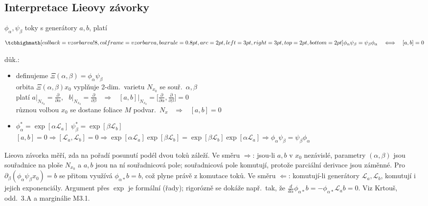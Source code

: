 \subsection{Interpretace Lieovy závorky}

\begin{veta}[Tvrzení]
$\phi_\alpha,\psi_\beta$ toky s generátory $a,b$, platí
\[
  \vzorec{\phi_\alpha\psi_\beta = \psi_\beta\phi_\alpha \quad\Longleftrightarrow\quad [a,b] = 0}
\]
\end{veta}
důk.:
\begin{itemize}[nosep]
  \item[$\Rightarrow$] definujeme $\Xi(\alpha,\beta) = \phi_\alpha\psi_\beta$ \\
    orbita $\Xi(\alpha,\beta)x_0$ vyplňuje 2-dim.\ varietu $N_{x_0}$ se souř.\ $\alpha,\beta$ \\
    platí $a\big|_{N_{x_0}} = \frac{\partial}{\partial\alpha}$, \ $b\big|_{N_{x_0}} = \frac{\partial}{\partial\beta}$
    \ $\Rightarrow$ \ $[a,b]\big|_{N_{x_0}} = \big[\frac{\partial}{\partial\alpha},\frac{\partial}{\partial\beta}\big] = 0$ \\
    různou volbou $x_0$ se dostane foliace $M$ podvar.\ $N_x$ \ $\Rightarrow$ \ $[a,b] = 0$
  \item[$\Leftarrow$] $\phi_\alpha^* = \exp[\alpha\mathcal{L}_a]$ \quad $\psi_\beta^* = \exp[\beta\mathcal{L}_b]$ \\
    $[a,b] = 0 \Rightarrow [\mathcal{L}_a,\mathcal{L}_b] = 0 \Rightarrow
    \exp[\alpha\mathcal{L}_a]\exp[\beta\mathcal{L}_b] = \exp[\beta\mathcal{L}_b]\exp[\alpha\mathcal{L}_a]
    \Rightarrow \phi_\alpha\psi_\beta = \psi_\beta\phi_\alpha$
\end{itemize}

\begin{vysvetleni}
Lieova závorka měří, zda na pořadí posunutí podél dvou toků záleží. Ve směru $\Rightarrow$: jsou-li $a,b$ v $x_0$ nezávislé, parametry $(\alpha,\beta)$ jsou souřadnice na ploše $N_{x_0}$ a $a,b$ jsou na ní souřadnicová pole; souřadnicová pole komutují, protože parciální derivace jsou záměnné. Pro $\partial_\beta(\phi_\alpha\psi_\beta x_0)=b$ se přitom využívá $\phi_{\alpha*}b=b$, což plyne právě z komutace toků.
Ve směru $\Leftarrow$: komutují-li generátory $\mathcal{L}_a,\mathcal{L}_b$, komutují i jejich exponenciály. Argument přes $\exp$ je formální (řady); rigorózně se dokáže např.\ tak, že $\frac{d}{d\alpha}\phi_{\alpha*}b=-\phi_{\alpha*}\mathcal{L}_ab=0$.
Viz Krtouš, odd.~3.A a marginálie M3.1.
\end{vysvetleni}

